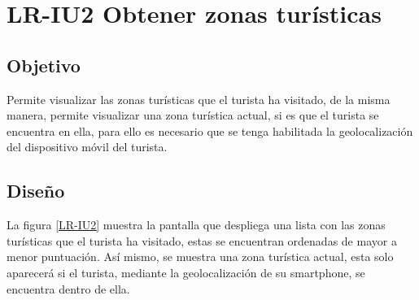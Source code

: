 \newpage
\section{LR-IU2 Obtener zonas turísticas}

\subsection{Objetivo}
Permite visualizar las zonas turísticas que el turista ha visitado, de la misma manera, permite visualizar una zona turística actual, si es que el turista se encuentra en ella, para ello es necesario que se tenga habilitada la geolocalización del dispositivo móvil del turista.

\subsection{Diseño}
La figura \ref{LR-IU2} muestra la pantalla  que despliega una lista con las zonas turísticas que el turista ha visitado, estas se encuentran ordenadas de mayor a menor puntuación. Así mismo, se muestra una zona turística actual, esta solo aparecerá si el turista, mediante la geolocalización de su smartphone, se encuentra dentro de ella.


